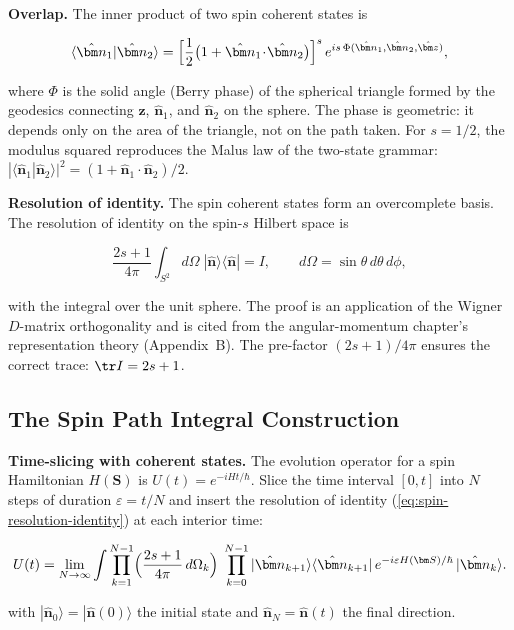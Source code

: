 \medskip\noindent\textbf{Overlap.} The inner product of two spin coherent states is
\begin{linenomath}
\begin{equation}
\langle\hat{\bm n}_{1}|\hat{\bm n}_{2}\rangle
= \Bigl[\frac{1}{2}\bigl(1 + \hat{\bm n}_{1}\!\cdot\!\hat{\bm n}_{2}\bigr)\Bigr]^{s}\,
e^{i s\,\Phi(\hat{\bm n}_{1},\hat{\bm n}_{2},\hat{\bm z})},
\label{eq:spin-coherent-overlap}
\end{equation}
\end{linenomath}
where $\Phi$ is the solid angle (Berry phase) of the spherical triangle formed by the geodesics connecting $\hat{\bm z}$, $\hat{\bm n}_{1}$, and $\hat{\bm n}_{2}$ on the sphere. The phase is geometric: it depends only on the area of the triangle, not on the path taken. For $s=1/2$, the modulus squared reproduces the Malus law of the two-state grammar: $|\langle\hat{\bm n}_{1}|\hat{\bm n}_{2}\rangle|^{2} = (1 + \hat{\bm n}_{1}\!\cdot\!\hat{\bm n}_{2})/2$.

\medskip\noindent\textbf{Resolution of identity.} The spin coherent states form an overcomplete basis. The resolution of identity on the spin-$s$ Hilbert space is
\begin{linenomath}
\begin{equation}
\frac{2s+1}{4\pi}\int_{S^{2}} d\Omega\;|\hat{\bm n}\rangle\langle\hat{\bm n}| = I,
\qquad d\Omega = \sin\theta\,d\theta\,d\phi,
\label{eq:spin-resolution-identity}
\end{equation}
\end{linenomath}
with the integral over the unit sphere. The proof is an application of the Wigner $D$-matrix orthogonality and is cited from the angular-momentum chapter's representation theory (Appendix~B). The pre-factor $(2s+1)/4\pi$ ensures the correct trace: $\tr I = 2s+1$.

\subsection{The Spin Path Integral Construction}

\medskip\noindent\textbf{Time-slicing with coherent states.} The evolution operator for a spin Hamiltonian $H(\bm S)$ is $U(t) = e^{-iHt/\hbar}$. Slice the time interval $[0,t]$ into $N$ steps of duration $\varepsilon = t/N$ and insert the resolution of identity (\eqref{eq:spin-resolution-identity}) at each interior time:
\begin{linenomath}
\begin{equation}
U(t) = \lim_{N\to\infty}\int \prod_{k=1}^{N-1}\Bigl(\frac{2s+1}{4\pi}\,d\Omega_{k}\Bigr)\;
\prod_{k=0}^{N-1}|\hat{\bm n}_{k+1}\rangle\langle\hat{\bm n}_{k+1}|\,
e^{-i\varepsilon H(\bm S)/\hbar}\,|\hat{\bm n}_{k}\rangle .
\label{eq:spin-time-slicing}
\end{equation}
\end{linenomath}
with $|\hat{\bm n}_{0}\rangle = |\hat{\bm n}(0)\rangle$ the initial state and $\hat{\bm n}_{N} = \hat{\bm n}(t)$ the final direction.

